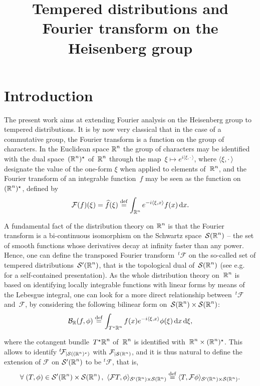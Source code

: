 \documentclass[AHL,Unicode,longabstracts]{cedram}
\title[Fourier transform on the Heisenberg group] {Tempered distributions and Fourier transform on the Heisenberg group}
\author[\initial{H.} \lastname{Bahouri}] {\firstname{Hajer} \lastname{Bahouri}}
\author[\initial{J.-Y.} \lastname{Chemin}]{\firstname{Jean-Yves} \lastname{Chemin}}
\author[\initial{R.} \lastname{Danchin}]{\firstname{Rapha\"el} \lastname{Danchin}}
\let\wh=\widehat
\def\R{{\mathop{\mathbb R\kern 0pt}\nolimits}}
\newcommand{\wh}{\widehat}
\newcommand*\cB{\mathcal{B}}
\newcommand*\cF{\mathcal{F}}
\newcommand*\cS{\mathcal{S}}
\newcommand*\R{\mathbb{R}}
\newcommand*\eqdefa{\overset{\mathrm{def}}{=}}
\newcommand*{\dd}{\mathrm{d}}
\newcommand{\dx}{\dd x}
\newcommand{\dxi}{\dd \xi}
\let\oldforall\forall
\renewcommand*{\forall}{\mathrel{\oldforall}}
\begin{document}
\enlargethispage{12pt}

\maketitle

\section{Introduction}

The present work aims at extending Fourier analysis on the Heisenberg group to tempered distributions. It is by now very classical that in the case of a commutative group, the Fourier transform is a function on the group of characters. In the Euclidean space $\R^n$ the group of characters may be identified with the dual space~$(\R^n)^\star$ of~$\R^n$ through the map~$\xi \mapsto e^{i\langle \xi,{\cdot\,}\rangle}$, where $\langle \xi,{\cdot\,}\rangle$ designate the value of the one-form $\xi$ when applied to elements of~$\R^n$, and the Fourier transform of an integrable function~$f$ may be seen as the function on $(\R^n)^\star$, defined by
\begin{equation}\label{definFourierclassic}
\cF (f) (\xi) = \wh f(\xi)\eqdefa \int_{\R^n} e^{-i\langle \xi,x\rangle } f(x)\, \dx.
\end{equation}

A fundamental fact of the distribution theory on $\R^n$ is that the Fourier transform is a bi-continuous isomorphism on the Schwartz space~$\cS(\R^n)$ -- the set of smooth functions whose derivatives decay at infinity faster than any power. Hence, one can define the transposed Fourier transform~${}^t\!\cF$ on the so-called set of tempered distributions~$\cS'(\R^n)$, that is the topological dual of~$\cS(\R^n)$ (see e.g.~\cite{rudin, S} for a self-contained presentation). As the whole distribution theory on~$\R^n$ is based on identifying locally integrable functions with linear forms by means of the Lebesgue integral, one can look for a more direct relationship between~${}^t\!\cF$ and~$\cF$, by considering the following bilinear form on~$\cS(\R^n)\times\cS(\R^n)$:
\begin{equation}\label{definFourierRbilin}
\cB_\R (f,\phi)\eqdefa \int_{T^\star \R^n} f(x) e^{-i\langle \xi,x\rangle} \phi(\xi) \,\dx \,\dxi,
\end{equation}

where the cotangent bundle~$T^\star \R^n$ of~$\R^n$ is identified with~$\R^n\times (\R^n)^\star$. This allows to identify ${}^t\!\cF_{|\cS((\R^n)^\star)}$ with $\cF_{|\cS(\R^n)}$, and it is thus natural to define the extension of $\cF$ on $\cS'(\R^n)$ to be ${}^t\!\cF$, that is,
\begin{equation}\label{definFourierS'}
\forall (T,\phi) \in \cS'(\R^n)\times\cS(\R^n)\,,\ \langle \cF T,\phi\rangle_{\cS'(\R^n)\times\cS(\R^n)}\eqdefa \langle T,\cF \phi\rangle_{\cS'(\R^n)\times\cS(\R^n)}.
\end{equation}
\end{document}
